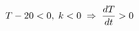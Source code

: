 \documentclass[preview]{standalone}
\begin{document}
\begin{align*}
\special{dvisvgm:raw <g id='unique000'>}T-20<0,\; k<0 \;\Rightarrow\; \frac{dT}{dt} > 0\special{dvisvgm:raw </g>}
\end{align*}
\end{document}
